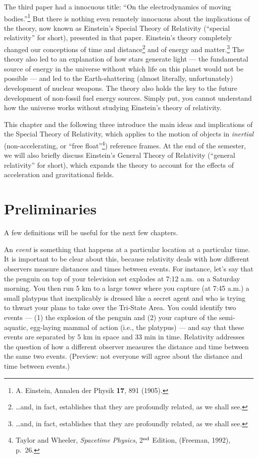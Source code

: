 The third paper had a innocuous title: ``On the electrodynamics of
moving bodies.''\footnote{A. Einstein, Annalen der Physik {\bf 17},
  891 (1905).} But there is nothing even remotely innocuous about the
implications of the theory, now known as Einstein's Special Theory of
Relativity (``special relativity'' for short), presented in that
paper.  Einstein's theory completely changed our conceptions of time
and distance\footnote{\dots and, in fact, establishes that they are
  profoundly related, as we shall see.} and of energy and
matter.\footnote{\dots and, in fact, establishes that they are
  profoundly related, as we shall see.}  The theory also led to an
explanation of how stars generate light --- the fundamental source of
energy in the universe without which life on this planet would not be
possible --- and led to the Earth-shattering (almost literally,
unfortunately) development of nuclear weapons.  The theory also holds
the key to the future development of non-fossil fuel energy sources.
Simply put, you cannot understand how the universe works without
studying Einstein's theory of relativity.
   
This chapter and the following three introduce the main ideas and
implications of the Special Theory of Relativity, which applies to the
motion of objects in {\em inertial} (non-accelerating, or ``free
float''\footnote{Taylor and Wheeler, {\it Spacetime Physics}, 2$^{\rm
    nd}$ Edition, (Freeman, 1992), p.\ 26.})  reference frames.  At the
end of the semester, we will also briefly discuss Einstein's General
Theory of Relativity (``general relativity'' for short), which expands
the theory to account for the effects of acceleration and
gravitational fields.

\section{Preliminaries}
A few definitions will be useful for the next few chapters.
   
An {\em event} is something that happens at a particular
location at a particular time.  It is important to be clear about
this, because relativity deals with how different observers measure
distances and times between events.  For instance, let's say that the
penguin on top of your television set explodes at 7:12 a.m.\ on a
Saturday morning.  You then run 5 km to a large tower where you
capture (at 7:45 a.m.) a small platypus that inexplicably is dressed like a
secret agent and who is trying to thwart your plans to take over
the Tri-State Area.  You could identify two events --- (1) the
explosion of the penguin and (2) your capture of the semi-aquatic,
egg-laying mammal of action (i.e., the platypus) --- and say
that these events are separated by 5 km in space and 33 min in time.
Relativity addresses the question of how a different observer measures
the distance and time between the same two events.  (Preview: not
everyone will agree about the distance and time between events.)
   

